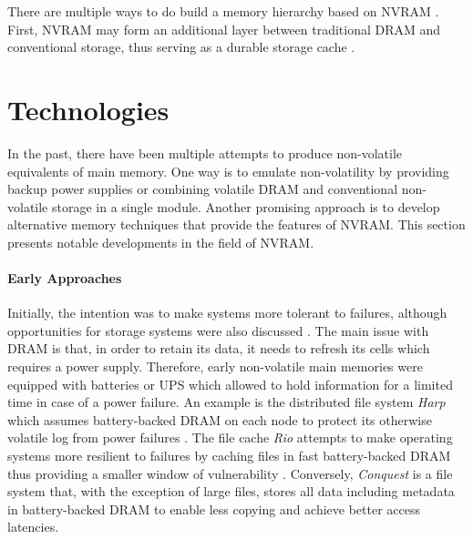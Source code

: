 There are multiple ways to do build a memory hierarchy based on NVRAM \cite{bailey2011implications}. First, NVRAM may form an additional layer between traditional DRAM and conventional storage, thus serving as a durable storage cache . 

\section{Technologies}

In the past, there have been multiple attempts to produce non-volatile
equivalents of main memory. One way is to emulate non-volatility by providing
backup power supplies or combining volatile DRAM and conventional non-volatile
storage in a single module. Another promising approach is to develop alternative
memory techniques that provide the features of NVRAM. This section presents
notable developments in the field of NVRAM.

\paragraph{Early Approaches}

Initially, the intention was to make systems more tolerant to failures, although
opportunities for storage systems were also discussed \cite{molina1992main,
wang2002conquest}. The main issue with DRAM is that, in order to retain its
data, it needs to refresh its cells which requires a power supply. Therefore,
early non-volatile main memories were equipped with batteries or UPS which
allowed to hold information for a limited time in case of a power failure. An
example is the distributed file system \emph{Harp} which assumes battery-backed
DRAM on each node to protect its otherwise volatile log from power failures
\cite{liskov1991replication}. The file cache \emph{Rio} attempts to make
operating systems more resilient to failures by caching files in fast
battery-backed DRAM thus providing a smaller window of vulnerability
\cite{chen1996rio}. Conversely, \emph{Conquest} is a file system that, with the
exception of large files, stores all data including metadata in battery-backed
DRAM \cite{wang2002conquest} to enable less copying and achieve better access latencies.


